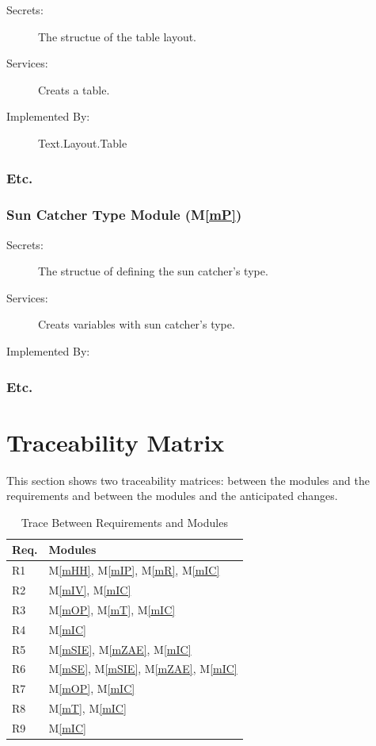 \documentclass[12pt, titlepage]{article}
\newcommand{\mref}[1]{M\ref{#1}}
\begin{document}
\begin{description}
\item[Secrets:] The structue  of the table layout.
\item[Services:] Creats  a table.
\item[Implemented By:] Text.Layout.Table
\end{description}
\subsubsection{Etc.}

\subsubsection{Sun Catcher Type Module (\mref{mP})}

\begin{description}
\item[Secrets:] The structue of defining the sun catcher's type.
\item[Services:] Creats variables with sun catcher's type.
\item[Implemented By:] \progname
\end{description}
\subsubsection{Etc.}


\section{Traceability Matrix} \label{SecTM}

This section shows two traceability matrices: between the modules and the
requirements and between the modules and the anticipated changes.

\begin{table}[H]
\centering
\begin{tabular}{p{} p{}}
\toprule
\textbf{Req.} & \textbf{Modules}\\
\midrule
R1 & \mref{mHH}, \mref{mIP}, \mref{mR}, \mref{mIC}\\
R2 & \mref{mIV}, \mref{mIC}\\
R3 & \mref{mOP}, \mref{mT}, \mref{mIC}\\
R4 & \mref{mIC}\\
R5 & \mref{mSIE}, \mref{mZAE}, \mref{mIC}\\
R6 & \mref{mSE}, \mref{mSIE}, \mref{mZAE}, \mref{mIC}\\
R7 &\mref{mOP}, \mref{mIC}\\
R8 & \mref{mT}, \mref{mIC}\\
R9 & \mref{mIC}\\
\bottomrule
\end{tabular}
\caption{Trace Between Requirements and Modules}
\label{TblRT}
\end{table}
\end{document}
